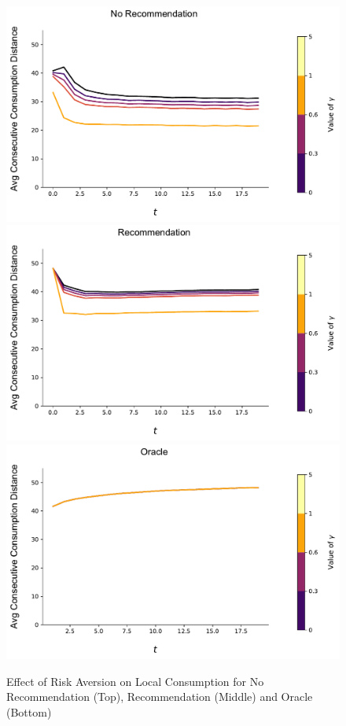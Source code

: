 \documentclass[sigconf, anonymous, review]{acmart}
\begin{document}
\begin{figure}[t]
\includegraphics[width=\linewidth]{figures/gamma_consumption_dist_N_200T_20.pdf}\\
\includegraphics[width=\linewidth]{figures/gamma_consumption_dist_N_200T_20_partial.pdf}\\
\includegraphics[width=\linewidth]{figures/gamma_consumption_dist_N_200T_20_omni.pdf}\\
\caption{Effect of Risk Aversion on Local Consumption for No Recommendation (Top), Recommendation (Middle) and Oracle (Bottom)}
\label{fig:no_rec_risk_aversion}
\end{figure}
\end{document}
